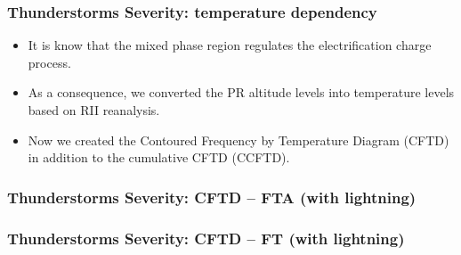 \documentclass[smaller]{beamer}
\begin{document}


\begin{frame}
\frametitle{Thunderstorms Severity: temperature dependency}
\begin{itemize}
\item It is know that the mixed phase region regulates the electrification charge process. 
\\
\item As a consequence, we converted the PR altitude levels into temperature levels based on RII reanalysis.
\item Now we created the Contoured Frequency by Temperature Diagram (CFTD) in addition to the cumulative CFTD (CCFTD).
\end{itemize}

\end{frame}






\begin{frame}
\frametitle{Thunderstorms Severity: CFTD -- FTA (with lightning) }

\end{frame}
\begin{frame}
\frametitle{Thunderstorms Severity: CFTD -- FT (with lightning)}

\end{frame}
\end{document}
